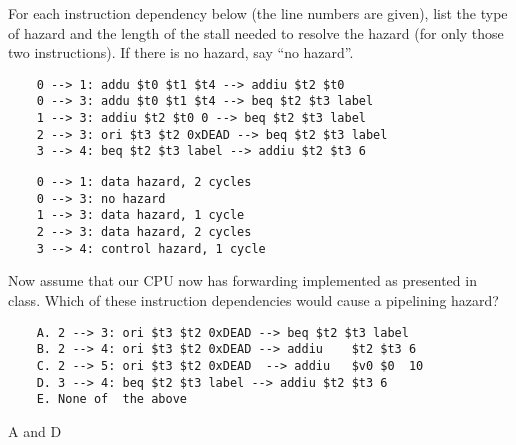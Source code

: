 \begin{blocksection}
\question
For each instruction dependency below (the line numbers are given), list the type of hazard and the length of the stall needed to resolve the hazard (for only those two instructions). If there is no hazard, say “no hazard”.
\begin{verbatim}
    0 --> 1: addu $t0 $t1 $t4 --> addiu $t2 $t0
    0 --> 3: addu $t0 $t1 $t4 --> beq $t2 $t3 label
    1 --> 3: addiu $t2 $t0 0 --> beq $t2 $t3 label
    2 --> 3: ori $t3 $t2 0xDEAD --> beq $t2 $t3 label
    3 --> 4: beq $t2 $t3 label --> addiu $t2 $t3 6
\end{verbatim}
\begin{solution}
    \begin{verbatim}
    0 --> 1: data hazard, 2 cycles
    0 --> 3: no hazard
    1 --> 3: data hazard, 1 cycle
    2 --> 3: data hazard, 2 cycles
    3 --> 4: control hazard, 1 cycle
    \end{verbatim}
\end{solution}



\question
Now assume that our CPU now has forwarding implemented as presented in class. Which of these instruction dependencies would cause a pipelining hazard?
\begin{verbatim}
    A. 2 --> 3: ori $t3 $t2 0xDEAD --> beq $t2 $t3 label
    B. 2 --> 4: ori	$t3	$t2	0xDEAD --> addiu	$t2	$t3	6
    C. 2 --> 5: ori	$t3	$t2	0xDEAD	--> addiu	$v0	$0	10
    D. 3 --> 4: beq $t2 $t3 label --> addiu $t2 $t3 6
    E. None	of	the	above
\end{verbatim}
\begin{solution}
A and D
\end{solution}

\end{blocksection}